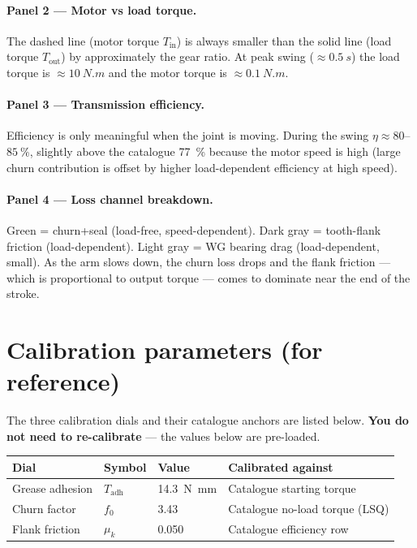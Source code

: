 \documentclass[11pt,a4paper]{article}
\begin{document}
\paragraph{Panel 2 — Motor vs load torque.}
The dashed line (motor torque \(T_\text{in}\)) is always smaller than the
solid line (load torque \(T_\text{out}\)) by approximately the gear ratio.
At peak swing (\(\approx\SI{0.5}{s}\)) the load torque is
\(\approx\SI{10}{N.m}\) and the motor torque is \(\approx\SI{0.1}{N.m}\).

\paragraph{Panel 3 — Transmission efficiency.}
Efficiency is only meaningful when the joint is moving.  During the swing
\(\eta \approx 80\)--\(\SI{85}{\percent}\), slightly above the catalogue
\SI{77}{\percent} because the motor speed is high (large churn contribution
is offset by higher load-dependent efficiency at high speed).

\paragraph{Panel 4 — Loss channel breakdown.}
Green = churn+seal (load-free, speed-dependent).
Dark gray = tooth-flank friction (load-dependent).
Light gray = WG bearing drag (load-dependent, small).
As the arm slows down, the churn loss drops and the flank friction — which
is proportional to output torque — comes to dominate near the end of the stroke.

\section{Calibration parameters (for reference)}

The three calibration dials and their catalogue anchors are listed below.
\textbf{You do not need to re-calibrate} — the values below are pre-loaded.

\bigskip
\begin{center}
\begin{tabular}{llll}
\toprule
Dial & Symbol & Value & Calibrated against \\
\midrule
Grease adhesion  & \(T_\text{adh}\) & \SI{14.3}{N.mm}   & Catalogue starting torque \\
Churn factor     & \(f_0\)          & 3.43              & Catalogue no-load torque (LSQ) \\
Flank friction   & \(\mu_k\)        & 0.050             & Catalogue efficiency row \\
\bottomrule
\end{tabular}
\end{center}
\end{document}
